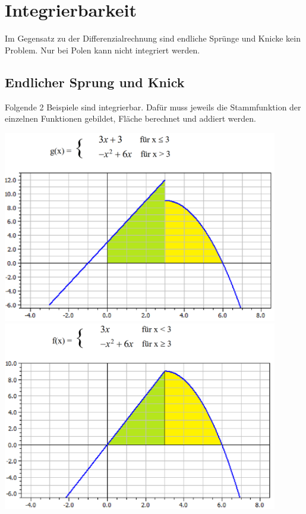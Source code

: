 \documentclass[12pt]{scrartcl}
\begin{document}
\newpage
\section{Integrierbarkeit}
Im Gegensatz zu der Differenzialrechnung sind endliche Sprünge und Knicke kein Problem.
Nur bei Polen kann nicht integriert werden.

\subsection{Endlicher Sprung und Knick}
Folgende 2 Beispiele sind integrierbar. Dafür muss jeweils die Stammfunktion der
einzelnen Funktionen gebildet, Fläche berechnet und addiert werden.
\begin{center}
    \includegraphics[width=12cm]{img/finite-jump.png}\\
    \vspace*{10px}
    \includegraphics[width=12cm]{img/kink.png}
\end{center}
\end{document}
